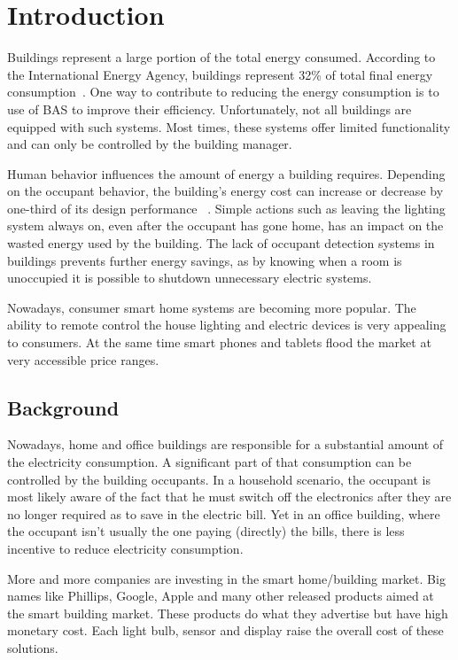 \chapter{Introduction}
\label{chapter:introduction}
Buildings represent a large portion of the total energy consumed. According to the International Energy Agency, buildings represent 32\% of total final energy consumption~\cite{iea}. One way to contribute to reducing the energy consumption is to use of \ac{BAS} to improve their efficiency. Unfortunately, not all buildings are equipped with such systems. Most times, these systems offer limited functionality and can only be controlled by the building manager.

Human behavior influences the amount of energy a building requires. Depending on the occupant behavior, the building's energy cost can increase or decrease by one-third of its design performance ~\cite{ocupancy2}. Simple actions such as leaving the lighting system always on, even after the occupant has gone home, has an impact on the wasted energy used by the building. The lack of occupant detection systems in buildings prevents further energy savings, as by knowing when a room is unoccupied it is possible to shutdown unnecessary electric systems.

Nowadays, consumer smart home systems are becoming more popular. The ability to remote control the house lighting and electric devices is very appealing to consumers. At the same time smart phones and tablets flood the market at very accessible price ranges. 

\section{Background}
\label{section:background}
Nowadays, home and office buildings are responsible for a substantial amount of the electricity consumption. A significant part of that consumption can be controlled by the building occupants. In a household scenario, the occupant is most likely aware of the fact that he must switch off the electronics after they are no longer required as to save in the electric bill. Yet in an office building, where the occupant isn't usually the one paying (directly) the bills, there is less incentive to reduce electricity consumption.

More and more companies are investing in the smart home/building market. Big names like Phillips, Google, Apple and many other released products aimed at the smart building market. These products do what they advertise but have high monetary cost. Each light bulb, sensor and display raise the overall cost of these solutions.


